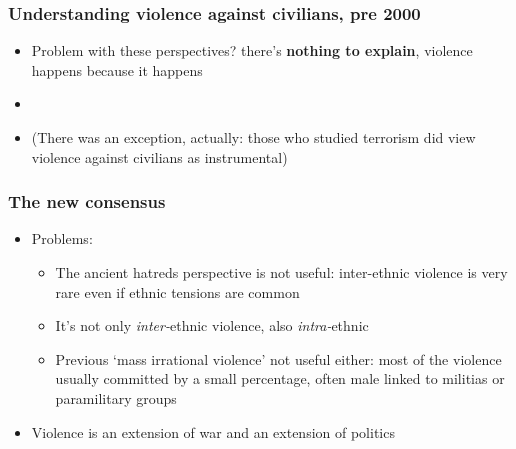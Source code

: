\documentclass[aspectratio=43]{beamer}
\begin{document}



\begin{frame}
\frametitle{Understanding violence against civilians, pre 2000}
\centering

\begin{itemize}
  \item<1-> Problem with these perspectives? there's \textbf{nothing to explain}, violence happens because it happens
  \item[]
  \item<2->[] (There was an exception, actually: those who studied terrorism did view violence against civilians as instrumental)
\end{itemize}


\end{frame}

\begin{frame}
\frametitle{The new consensus}
\centering

\begin{itemize}[<+->]
  \item Problems:
  \begin{itemize}
    \item The ancient hatreds perspective is not useful: inter-ethnic violence is very rare even if ethnic tensions are common
    \item It's not only \textit{inter-}ethnic violence, also \textit{intra-}ethnic
    \item Previous `mass irrational violence' not useful either: most of the violence usually committed by a small percentage, often male linked to militias or paramilitary groups
  \end{itemize}
  \item Violence is an extension of war and an extension of politics
\end{itemize}



\end{frame}
\end{document}
